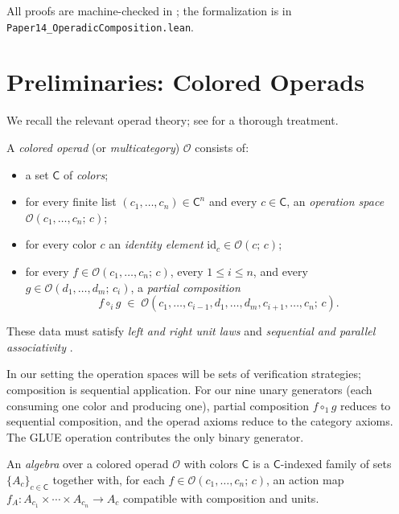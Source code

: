 \documentclass[11pt]{article}
\newcommand{\GrColor}{\mathsf{C}}        %
\begin{document}
All proofs are machine-checked in \LEAN; the formalization is in
\texttt{Paper14\_OperadicComposition.lean}.

\section{Preliminaries: Colored Operads}\label{sec:prelim}

We recall the relevant operad theory; see \cite{Loday2012AlgebrasOperads}
for a thorough treatment.

\begin{definition}\label{def:coloredoperad}
A \emph{colored operad} (or \emph{multicategory}) $\mathcal{O}$ consists of:
\begin{itemize}[nosep]
\item a set $\GrColor$ of \emph{colors};
\item for every finite list $(c_1,\ldots,c_n) \in \GrColor^n$ and every
  $c \in \GrColor$, an \emph{operation space}
  $\mathcal{O}(c_1,\ldots,c_n;\,c)$;
\item for every color $c$ an \emph{identity element}
  $\mathrm{id}_c \in \mathcal{O}(c;\,c)$;
\item for every $f \in \mathcal{O}(c_1,\ldots,c_n;\,c)$, every
  $1 \le i \le n$, and every $g \in \mathcal{O}(d_1,\ldots,d_m;\,c_i)$,
  a \emph{partial composition}
  \[
    f \circ_i g \;\in\;
    \mathcal{O}(c_1,\ldots,c_{i-1},d_1,\ldots,d_m,c_{i+1},\ldots,c_n;\,c).
  \]
\end{itemize}
These data must satisfy \emph{left and right unit laws} and
\emph{sequential and parallel associativity}
\cite[Def.~1.2]{Loday2012AlgebrasOperads}.
\end{definition}

In our setting the operation spaces will be sets of verification
strategies; composition is sequential application.  For our nine unary
generators (each consuming one color and producing one), partial
composition $f \circ_1 g$ reduces to sequential composition, and the
operad axioms reduce to the category axioms.  The GLUE operation
contributes the only binary generator.

\begin{definition}
An \emph{algebra} over a colored operad $\mathcal{O}$ with colors $\GrColor$
is a $\GrColor$-indexed family of sets $\{A_c\}_{c \in \GrColor}$ together
with, for each $f \in \mathcal{O}(c_1,\ldots,c_n;\,c)$, an action map
$f_A : A_{c_1} \times \cdots \times A_{c_n} \to A_c$ compatible with
composition and units.
\end{definition}
\end{document}
